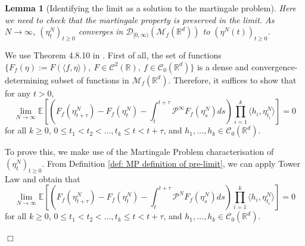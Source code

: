 \documentclass[12pt]{article}
\newenvironment {proof}{{\noindent\bf Proof }}{\hfill $\Box$ \medskip}
\newtheorem{lemma}[theorem]{Lemma}
\newcommand{\IR}{\mathbb R}
\newcommand{\Pgen}{\mathcal{P}}    %
\newcommand{\comment}[1]{{\color{blue} \it #1}}
\begin{document}
\begin{lemma}[Identifying the limit as a solution to the martingale problem]
    \label{lem:limit_mgale}
    \comment{Here we need to check that the martingale property is preserved in the limit.}
As $N \to \infty$,
$(\eta^{N}_t)_{t \geq 0}$ converges in $\mathcal{D}_{[0,\infty)}(\mathcal{M}_f(\IR^d))$
to $(\eta^{N}(t))_{t \geq 0}$.
\end{lemma}
\begin{proof}
We use Theorem 4.8.10 in \cite{EK}.
First of all, the set of functions
$\{F_f(\eta):= F(\langle f, \eta \rangle ),~
F \in \mathcal{C}^{2}(\IR), ~
f \in \mathcal{C}_{0}(\IR^d)\}$
is a dense and convergence-determining 
subset of functions in $\mathcal{M}_f(\IR^d)$.
Therefore, it suffices to show that for any $t>0$,
\begin{equation}
    \label{eq: Convergence Condition}
\lim_{N \to \infty}
\mathbb{E}\left[
\left(
F_f(\eta^{N}_{t+\tau})-F_f(\eta^{N}_t)
-\int_{t}^{t+\tau}\Pgen^{\infty}F_f(\eta^{N}_s)ds
\right)
\prod_{i=1}^{k}\langle h_i,\eta^{N}_{t_i} \rangle
\right]=0
\end{equation}
for all $k\geq 0$, $0\leq t_1<t_2<...,t_k \leq t < t+\tau$,
and $h_1,...,h_k \in \mathcal{C}_{0}(\IR^d)$.

To prove this,
we make use of the Martingale Problem characterisation
of $(\eta^{N}_t)_{t \geq 0}$.
From Definition \ref{def: MP definition of pre-limit},
we can apply Tower Law
and obtain that
\begin{equation}
    \label{eq: Prelimit MP Application}
\lim_{N \to \infty}
\mathbb{E}\left[
\left(
F_f(\eta^{N}_{t+\tau})-F_f(\eta^{N}_t)
-\int_{t}^{t+\tau}\Pgen^{N}F_f(\eta^{N}_s)ds
\right)
\prod_{i=1}^{k}\langle h_i,\eta^{N}_{t_i} \rangle
\right]=0
\end{equation}
for all $k\geq 0$, $0\leq t_1<t_2<...,t_k \leq t < t+\tau$,
and $h_1,...,h_k \in \mathcal{C}_{0}(\IR^d)$.


\end{proof}
\end{document}
